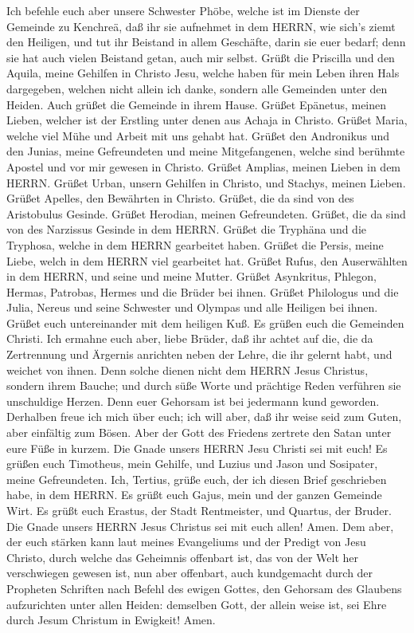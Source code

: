  Ich befehle euch aber unsere Schwester Phöbe, welche ist im
Dienste der Gemeinde zu Kenchreä,  daß ihr sie aufnehmet in
dem HERRN, wie sich's ziemt den Heiligen, und tut ihr Beistand in allem
Geschäfte, darin sie euer bedarf; denn sie hat auch vielen Beistand
getan, auch mir selbst.  Grüßt die Priscilla und den Aquila,
meine Gehilfen in Christo Jesu,  welche haben für mein Leben
ihren Hals dargegeben, welchen nicht allein ich danke, sondern alle
Gemeinden unter den Heiden.  Auch grüßet die Gemeinde in
ihrem Hause. Grüßet Epänetus, meinen Lieben, welcher ist der Erstling
unter denen aus Achaja in Christo.  Grüßet Maria, welche
viel Mühe und Arbeit mit uns gehabt hat.  Grüßet den
Andronikus und den Junias, meine Gefreundeten und meine Mitgefangenen,
welche sind berühmte Apostel und vor mir gewesen in Christo.
 Grüßet Amplias, meinen Lieben in dem HERRN. 
Grüßet Urban, unsern Gehilfen in Christo, und Stachys, meinen Lieben.
 Grüßet Apelles, den Bewährten in Christo. Grüßet, die da
sind von des Aristobulus Gesinde.  Grüßet Herodian, meinen
Gefreundeten. Grüßet, die da sind von des Narzissus Gesinde in dem
HERRN.  Grüßet die Tryphäna und die Tryphosa, welche in dem
HERRN gearbeitet haben. Grüßet die Persis, meine Liebe, welch in dem
HERRN viel gearbeitet hat.  Grüßet Rufus, den Auserwählten
in dem HERRN, und seine und meine Mutter.  Grüßet
Asynkritus, Phlegon, Hermas, Patrobas, Hermes und die Brüder bei ihnen.
 Grüßet Philologus und die Julia, Nereus und seine
Schwester und Olympas und alle Heiligen bei ihnen.  Grüßet
euch untereinander mit dem heiligen Kuß. Es grüßen euch die Gemeinden
Christi.  Ich ermahne euch aber, liebe Brüder, daß ihr
achtet auf die, die da Zertrennung und Ärgernis anrichten neben der
Lehre, die ihr gelernt habt, und weichet von ihnen.  Denn
solche dienen nicht dem HERRN Jesus Christus, sondern ihrem Bauche; und
durch süße Worte und prächtige Reden verführen sie unschuldige Herzen.
 Denn euer Gehorsam ist bei jedermann kund geworden.
Derhalben freue ich mich über euch; ich will aber, daß ihr weise seid
zum Guten, aber einfältig zum Bösen.  Aber der Gott des
Friedens zertrete den Satan unter eure Füße in kurzem. Die Gnade unsers
HERRN Jesu Christi sei mit euch!  Es grüßen euch Timotheus,
mein Gehilfe, und Luzius und Jason und Sosipater, meine Gefreundeten.
 Ich, Tertius, grüße euch, der ich diesen Brief geschrieben
habe, in dem HERRN.  Es grüßt euch Gajus, mein und der
ganzen Gemeinde Wirt. Es grüßt euch Erastus, der Stadt Rentmeister, und
Quartus, der Bruder.  Die Gnade unsers HERRN Jesus Christus
sei mit euch allen! Amen.  Dem aber, der euch stärken kann
laut meines Evangeliums und der Predigt von Jesu Christo, durch welche
das Geheimnis offenbart ist, das von der Welt her verschwiegen gewesen
ist,  nun aber offenbart, auch kundgemacht durch der
Propheten Schriften nach Befehl des ewigen Gottes, den Gehorsam des
Glaubens aufzurichten unter allen Heiden:  demselben Gott,
der allein weise ist, sei Ehre durch Jesum Christum in Ewigkeit! Amen.
